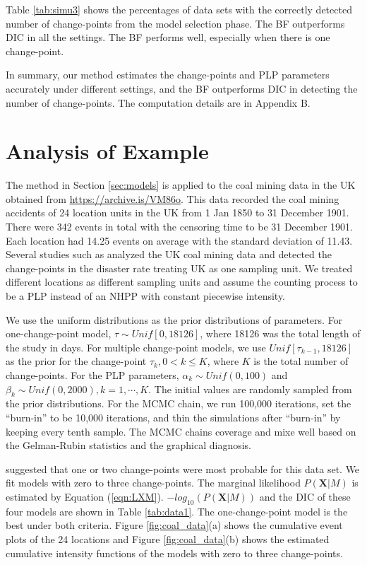\documentclass[12pt]{article}
\numberwithin{equation}{section}
\begin{document}
Table \ref{tab:simu3} shows the percentages of data sets with the correctly detected number of change-points from the model selection phase. The BF outperforms DIC in all the settings. The BF performs well, especially when there is one change-point. 

In summary, our method estimates the change-points and PLP parameters accurately under different settings, and the BF outperforms DIC in detecting the number of change-points. The computation details are in Appendix B. 
\section{Analysis of Example}\label{sec:data_analysis}
The method in Section \ref{sec:models} is applied to the coal mining data in the UK obtained from \url{https://archive.is/VM86o}. This data recorded the coal mining accidents of 24 location units in the UK from 1 Jan 1850 to 31 December 1901. There were 342 events in total with the censoring time to be 31 December 1901. Each location had 14.25 events on average with the standard deviation of 11.43. Several studies such as \citet{Raftery1986, Carlin1992, Green1995} analyzed the UK coal mining data and detected the change-points in the disaster rate treating UK as one sampling unit.  We treated different locations as different sampling units and assume the counting process to be a PLP instead of an NHPP with constant piecewise intensity. 

We use the uniform distributions as the prior distributions of parameters. For one-change-point model, $\tau\sim Unif[0, 18126]$, where 18126 was the total length of the study in days. For multiple change-point models, we use $Unif[\tau_{k-1}, 18126]$ as the prior for the change-point $\tau_{k}, 0<k\leq K$, where $K$ is the total number of change-points. For the PLP parameters, $\alpha_k\sim Unif(0, 100)$ and $\beta_k \sim Unif(0, 2000), k = 1, \cdots, K$.  The initial values are randomly sampled from the prior distributions. For the MCMC chain, we run 100,000 iterations, set the ``burn-in'' to be 10,000 iterations, and thin the simulations after ``burn-in'' by keeping every tenth sample. The MCMC chains coverage and mixe well based on the Gelman-Rubin statistics and the graphical diagnosis. 

\citet{Ruggeri2005} suggested that one or two change-points were most probable for this data set. We fit models with zero to three change-points. The marginal likelihood $P(\pmb X|M)$ is estimated by Equation (\ref{eqn:LXM}). $-log_{10}(P(\pmb X|M))$ and the DIC of these four models are shown in Table \ref{tab:data1}. The one-change-point model is the best under both criteria. Figure \ref{fig:coal_data}(a) shows the cumulative event plots of the 24 locations and Figure \ref{fig:coal_data}(b) shows the estimated cumulative intensity functions of the models with zero to three change-points.
\end{document}
